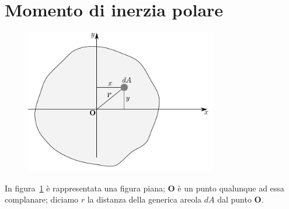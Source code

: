 \section{Momento di inerzia polare}
\renewcommand{\thefigure}{2~-~5}
\begin{figure}[ht]
\centering
\includegraphics[width=0.75\textwidth]{Immagini/Parte_2/Figura2_5/Figura2_5.pdf}
\caption{}
\label{figura2-5}
\end{figure}
In figura~\ref{figura2-5} è rappresentata una figura piana; $\mathbf{O}$ è un punto qualunque ad essa complanare; diciamo $r$ la distanza della generica areola $dA$ dal punto $\mathbf{O}$. 


